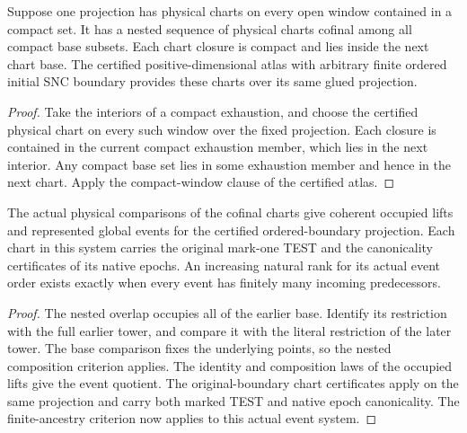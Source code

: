 \begin{theorem}
\label{hir:g8-cofinal-certified-charts}
\leanok
Suppose one projection has physical charts on every open window
contained in a compact set. It has a nested sequence of physical
charts cofinal among all compact base subsets. Each chart closure
is compact and lies inside the next chart base. The certified
positive-dimensional atlas with arbitrary finite ordered initial
SNC boundary provides these charts over its same glued projection.
\end{theorem}
\begin{proof}
Take the interiors of a compact exhaustion, and choose the
certified physical chart on every such window over the fixed
projection. Each closure is contained in the current compact
exhaustion member, which lies in the next interior. Any compact
base set lies in some exhaustion member and hence in the next
chart. Apply the compact-window clause of the certified atlas.
\end{proof}

\begin{theorem}
\label{hir:g8-certified-cofinal-events}
\leanok
The actual physical comparisons of the cofinal charts give coherent
occupied lifts and represented global events for the certified
ordered-boundary projection. Each chart in this system carries the
original mark-one TEST and the canonicality certificates of its
native epochs. An increasing natural rank for its actual
event order exists exactly when every event has finitely many
incoming predecessors.
\end{theorem}
\begin{proof}
The nested overlap occupies all of the earlier base. Identify its
restriction with the full earlier tower, and compare it with the
literal restriction of the later tower. The base comparison fixes
the underlying points, so the nested composition criterion applies.
The identity and composition laws of the occupied lifts give the
event quotient. The original-boundary chart certificates apply on
the same projection and carry both marked TEST and native epoch
canonicality. The finite-ancestry criterion now applies to this
actual event system.
\end{proof}


